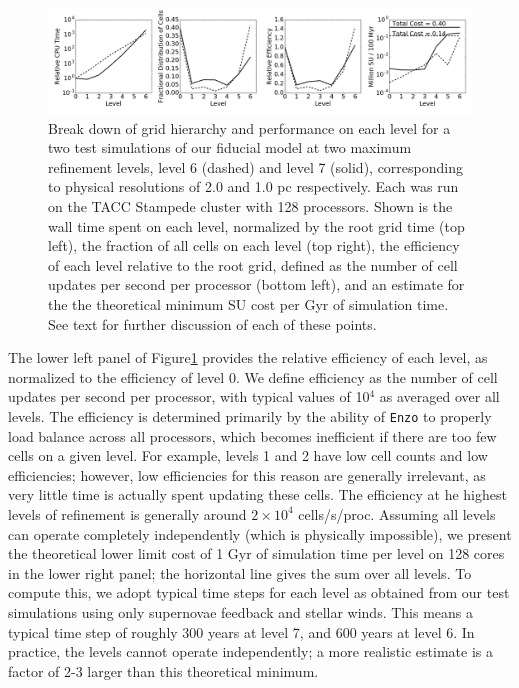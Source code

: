 \documentclass[11pt]{article}
\begin{document}
\begin{figure}
\centering
\includegraphics[width=0.95\linewidth]{enzo_levels}
\caption{Break down of grid hierarchy and performance on each level for a two test simulations of our fiducial model at two maximum refinement levels, level 6 (dashed) and level 7 (solid), corresponding to physical resolutions of 2.0 and 1.0 pc respectively. Each was run on the TACC Stampede cluster with 128 processors. Shown is the wall time spent on each level, normalized by the root grid time (top left), the fraction of all cells on each level (top right), the efficiency of each level relative to the root grid, defined as the number of cell updates per second per processor (bottom left), and an estimate for the the theoretical minimum SU cost per Gyr of simulation time. See text for further discussion of each of these points.}
\label{fig:levels}
\end{figure}

The lower left panel of Figure\ref{fig:levels} provides the relative efficiency of each level, as normalized to the efficiency of level 0. We define efficiency as the number of cell updates per second per processor, with typical values of 10$^4$ as averaged over all levels. The efficiency is determined primarily by the ability of \texttt{Enzo} to properly load balance across all processors, which becomes inefficient if there are too few cells on a given level. For example, levels 1 and 2 have low cell counts and low efficiencies; however, low efficiencies for this reason are generally irrelevant, as very little time is actually spent updating these cells. The efficiency at he highest levels of refinement is generally around $2\times 10^4$ cells/s/proc. Assuming all levels can operate completely independently (which is physically impossible), we present the theoretical lower limit cost of 1 Gyr of simulation time per level on 128 cores in the lower right panel; the horizontal line gives the sum over all levels. To compute this, we adopt typical time steps for each level as obtained from our test simulations using only supernovae feedback and stellar winds. This means a typical time step of roughly 300 years at level 7, and 600 years at level 6. In practice, the levels cannot operate independently; a more realistic estimate is a factor of 2-3 larger than this theoretical minimum.
\end{document}
